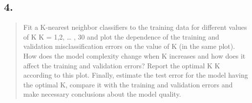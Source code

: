 \documentclass[
]{article}
\begin{document}
\hypertarget{section-3}{%
\subsection{4.}\label{section-3}}

\begin{quote}
Fit a K-nearest neighbor classifiers to the training data for different
values of K K = 1,2, \ldots{} , 30 and plot the dependence of the
training and validation misclassification errors on the value of K (in
the same plot). How does the model complexity change when K increases
and how does it affect the training and validation errors? Report the
optimal K K according to this plot. Finally, estimate the test error for
the model having the optimal K, compare it with the training and
validation errors and make necessary conclusions about the model
quality.
\end{quote}
\end{document}
